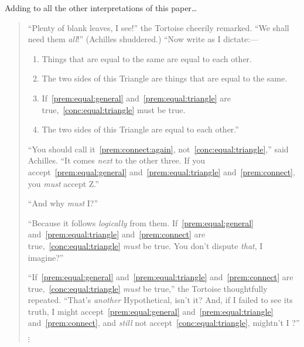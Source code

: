 \begin{note}
  \color{red}
  Adding to all the other interpretations of this paper\dots
\end{note}

\begin{note}
  \begin{quote}
    ``Plenty of blank leaves, I see!'' the Tortoise cheerily remarked.
    ``We shall need them \emph{all}!''
    (Achilles shuddered.)
    ``Now write as I dictate:---

    \begin{enumerate}[label=(\emph{\Alph*}), ref=\emph{\Alph*}]
    \item
      \label{prem:equal:general}
      Things that are equal to the same are equal to each other.
    \item
      \label{prem:equal:triangle}
      The two sides of this Triangle are things that are equal to the same.
    \item
      \label{prem:connect}
      If~\ref{prem:equal:general} and~\ref{prem:equal:triangle} are true,~\ref{conc:equal:triangle} must be true.
      \setcounter{enumi}{25}
    \item
      \label{conc:equal:triangle}
      The two sides of this Triangle are equal to each other.''
    \end{enumerate}

    ``You should call it~\ref{prem:connect:again}, not~\ref{conc:equal:triangle},'' said Achilles.
    ``It comes \emph{next} to the other three.
    If you accept~\ref{prem:equal:general} and~\ref{prem:equal:triangle} and~\ref{prem:connect}, you \emph{must} accept Z.''

    ``And why \emph{must} I?''

    ``Because it follows \emph{logically} from them.
    If~\ref{prem:equal:general} and~\ref{prem:equal:triangle} and~\ref{prem:connect} are true,~\ref{conc:equal:triangle} \emph{must} be true.
    You don't dispute \emph{that}, I imagine?''

    ``If~\ref{prem:equal:general} and~\ref{prem:equal:triangle} and~\ref{prem:connect} are true,~\ref{conc:equal:triangle} \emph{must} be true,'' the Tortoise thoughtfully repeated.
    ``That's \emph{another} Hypothetical, isn't it?
    And, if I failed to see its truth, I might accept~\ref{prem:equal:general} and~\ref{prem:equal:triangle} and~\ref{prem:connect}, and \emph{still} not accept~\ref{conc:equal:triangle}, mightn't I ?''

    \mbox{}\hfill\(\vdots\)\hfill\mbox{}


\end{quote}
\end{note}
